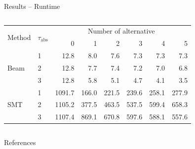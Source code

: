 \documentclass[en, navbaroff, handout]{sdqbeamer}
\begin{document}
\begin{frame}[t]{Results -- Runtime}
\begin{columns}[T]
\begin{column}{\kitthreecolumns}
\begin{table}[t]
\begin{tabular}{llrrrrrr}
					\toprule
					\multirow{2}{*}{Method} & \multirow{2}{*}{$\tau_{\text{abs}}$} & \multicolumn{6}{c}{Number of alternative} \\
					\cmidrule(lr){3-8}
					& & 0 & 1 & 2 & 3 & 4 & 5 \\
					\midrule
					\multirow[t]{3}{*}{Beam} & 1 & 12.8 & 8.0 & 7.6 & 7.3 & 7.3 & 7.3 \\
					& 2 & 12.8 & 7.7 & 7.4 & 7.2 & 7.0 & 6.8 \\
					& 3 & 12.8 & 5.8 & 5.1 & 4.7 & 4.1 & 3.5 \\
					\multirow[t]{3}{*}{SMT} & 1 & 1091.7 & 166.0 & 221.5 & 239.6 & 258.1 & 277.9 \\
					& 2 & 1105.2 & 377.5 & 463.5 & 537.5 & 599.4 & 658.3 \\
					& 3 & 1107.4 & 869.1 & 670.8 & 597.6 & 588.1 & 557.6 \\
					\bottomrule
				\end{tabular}
				\label{tab:csd:alteratives-runtime}
			\end{table}
		\end{column}
	\end{columns}
\end{frame}

\begin{frame}[t, allowframebreaks]{References}
	\printbibliography
\end{frame}

\backupend
\end{document}
